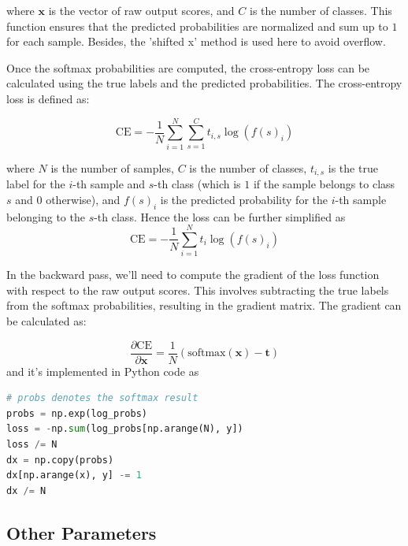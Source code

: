 \documentclass[10pt,a4paper,twoside]{tau}
\renewcommand{\vec}[1]{\mathbf{#1}}
\begin{document}
where $\vec{x}$ is the vector of raw output scores, and $C$ is the number of classes. This function ensures that the predicted probabilities are normalized and sum up to $1$ for each sample. Besides, the 'shifted x' method is used here to avoid overflow.

Once the softmax probabilities are computed, the cross-entropy loss can be calculated using the true labels and the predicted probabilities. The cross-entropy loss is defined as:

\begin{equation}
\text{CE} = -\frac{1}{N} \sum_{i=1}^{N} \sum_{s=1}^{C} t_{i,s} \log(f(s)_i) \tag{3.3.3}
\end{equation}

where $N$ is the number of samples, $C$ is the number of classes, $t_{i,s}$ is the true label for the $i$-th sample and $s$-th class (which is $1$ if the sample belongs to class $s$ and $0$ otherwise), and $f(s)_i$ is the predicted probability for the $i$-th sample belonging to the $s$-th class. Hence the loss can be further simplified as
\begin{equation}
    \text{CE} = -\frac{1}{N} \sum_{i=1}^{N} t_i \log(f(s)_i) \tag{3.3.4}
\end{equation}

In the backward pass, we'll need to compute the gradient of the loss function with respect to the raw output scores. This involves subtracting the true labels from the softmax probabilities, resulting in the gradient matrix. The gradient can be calculated as:

\begin{equation}
\frac{\partial \text{CE}}{\partial \mathbf{x}} = \frac{1}{N} (\text{softmax}(\mathbf{x}) - \mathbf{t}) \tag{3.3.5}
\end{equation}
and it's implemented in Python code as
\begin{center}
\begin{lstlisting}[language=Python,
        stringstyle=\color{green},
        numbers=none,
        keywordstyle=\color{purple},
        keywords={np, arange, sum, copy, exp}
    ]
# probs denotes the softmax result
probs = np.exp(log_probs)
loss = -np.sum(log_probs[np.arange(N), y])
loss /= N
dx = np.copy(probs)
dx[np.arange(x), y] -= 1
dx /= N
\end{lstlisting}   
\end{center}


\subsection{Other Parameters}
\end{document}
